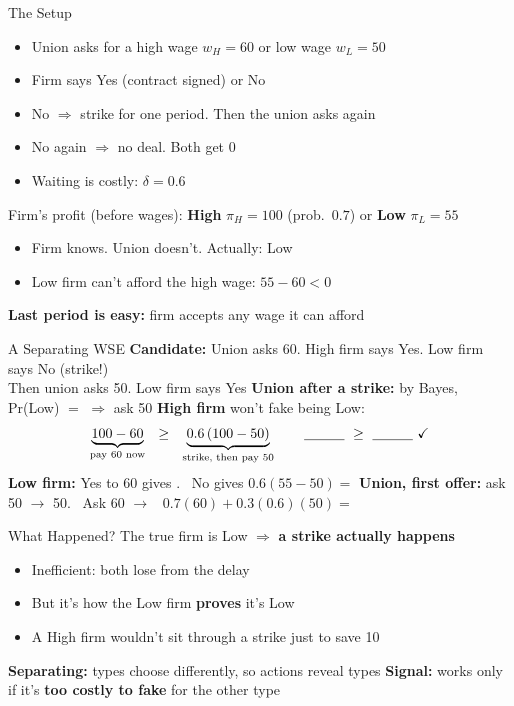 \begin{frame}{The Setup}
\begin{itemize}
    \item Union asks for a high wage $w_H=60$ or low wage $w_L=50$
    \item Firm says Yes (contract signed) or No
    \item No $\Rightarrow$ strike for one period. Then the union asks again
    \item No again $\Rightarrow$ no deal. Both get 0
    \item Waiting is costly: $\delta=0.6$
\end{itemize}
\bsk
Firm's profit (before wages): \textbf{High} $\pi_H=100$ (prob.\ $0.7$) or \textbf{Low} $\pi_L=55$
\begin{itemize}
    \item Firm knows. Union doesn't. Actually: Low
    \item Low firm can't afford the high wage: $55-60<0$
\end{itemize}
\bsk
\textbf{Last period is easy:} firm accepts any wage it can afford
\vspace{-0.3in}
\end{frame}

\begin{frame}{A Separating WSE}
\textbf{Candidate:} Union asks 60. High firm says Yes. Low firm says No (strike!)\\
Then union asks 50. Low firm says Yes
\bsk
\textbf{Union after a strike:} by Bayes, Pr(Low) $=$ \underline{\hspace{0.4in}} $\Rightarrow$ ask 50 \checkmark
\bsk
\textbf{High firm} won't fake being Low:
$$\underbrace{100-60}_{\text{pay 60 now}}\ \ \ge\ \ \underbrace{0.6\,(100-50)}_{\text{strike, then pay 50}} \qquad \underline{\hspace{0.4in}}\ \ge\ \underline{\hspace{0.4in}}\ \checkmark$$
\textbf{Low firm:} Yes to 60 gives \underline{\hspace{0.3in}}. \ No gives $0.6(55-50)=$ \underline{\hspace{0.3in}}
\bsk
\textbf{Union, first offer:} ask 50 $\to$ 50. \ Ask 60 $\to$ \ $0.7(60)+0.3(0.6)(50)=$ \underline{\hspace{0.4in}}
\vspace{-0.3in}
\end{frame}

\begin{frame}{What Happened?}
The true firm is Low $\Rightarrow$ \textbf{a strike actually happens}
\bsk
\begin{itemize}
    \item Inefficient: both lose from the delay
    \item But it's how the Low firm \textbf{proves} it's Low
    \item A High firm wouldn't sit through a strike just to save 10
\end{itemize}
\bsk
\textbf{Separating:} types choose differently, so actions reveal types
\bsk
\textbf{Signal:} works only if it's \textbf{too costly to fake} for the other type
\vspace{-0.3in}
\end{frame}

